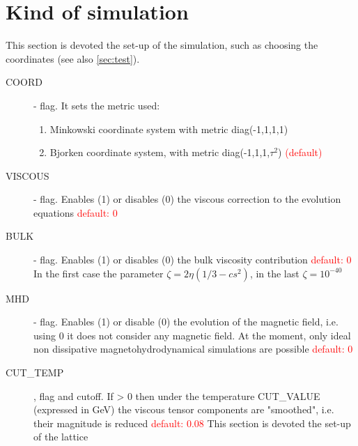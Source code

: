 \section{Kind of simulation}
This section is devoted the set-up of the simulation, such as choosing the coordinates (see also \ref{sec:test}).
\begin{description}
\item[COORD] \integer - flag. It sets the metric used:
    \begin{enumerate}
     \item  Minkowski coordinate system with metric diag(-1,1,1,1)
     \item  Bjorken coordinate system, with metric diag(-1,1,1,$\tau^2$) \textcolor{red}{(default)}
    \end{enumerate}
\item[VISCOUS] \integer - flag. Enables (1) or disables (0) the viscous correction to the evolution equations \textcolor{red}{default: 0}
\item[BULK] \integer - flag. Enables (1) or disables (0) the bulk viscosity contribution \textcolor{red}{default: 0}
In the first case the parameter $\zeta=2\eta(1/3-cs^2)$, in the last $\zeta=10^{-40}$\\
\item[MHD] \integer - flag. Enables (1) or disable (0) the evolution of the magnetic field, i.e. using 0 it does not consider any magnetic field. At the moment, only ideal non dissipative magnetohydrodynamical simulations are possible \textcolor{red}{default: 0}
\item[CUT\_TEMP] \real, flag and cutoff. If > 0 then under the temperature CUT\_VALUE (expressed in GeV) the viscous tensor components are "smoothed", i.e. their magnitude is reduced \textcolor{red}{default: 0.08}
This section is devoted the set-up of the lattice
\end{description}

